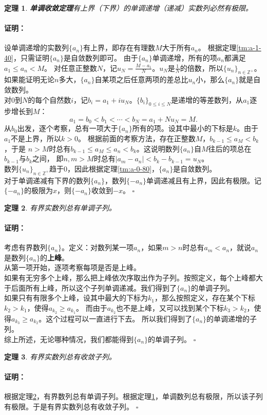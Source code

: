 \documentclass[12pt,UTF8]{ctexbook}
\newtheorem{tm}{定理}[section]
\newenvironment{proof2}{\paragraph{\textbf{证明：}}}{\hfill$\square$}
\begin{document}
\begin{appendix}
\begin{tm}\textbf{单调收敛定理}\label{tm:a-2-10}
    有上界（下界）的单调递增（递减）实数列必然有极限。
\end{tm}
\begin{proof2}
    设单调递增的实数列$\{a_n\}$有上界，即存在有理数$M$大于所有$a_n$。
    根据定理\ref{tm:a-1-40}，只需证明$\{a_n\}$是自敛数列即可。
    由于$\{a_n\}$单调递增，所有的项$a_n$都满足$a_1\leqslant a_n < M$。
    对任意正整数$N$，记$u_N = \frac{M - a_1}{N}$。$u_N$是$\frac{1}{N}$的倍数，所以$\{u_n\}_{n\in\mathbb{Z}^+}$。
    如果能证明无论$n$多大，$\{a_n\}$自某项之后任意两项的差总比$u_n$小，那么$\{a_n\}$就是自敛数列。\\
    对$0$到$N$的每个自然数$i$，记$b_i = a_1 + iu_N$。$\{b_i\}_{0\leqslant i\leqslant N}$是递增的等差数列，从$a_1$逐步增长到$M$：
    $$ a_1 = b_0 < b_1 < \cdots < b_N = a_1 + Nu_N = M.$$
    从$b_0$出发，逐个考察，总有一项大于$\{a_n\}$所有的项。设其中最小的下标是$k$。由于$a_1$不是上界，所以$k>0$。
    根据前面的考察方法，存在正整数$M$，$b_{k-1} \leqslant a_M < b_k$，于是
    $n>M$时总有$b_{k-1} \leqslant a_M \leqslant a_n < b_k$。这说明数列$\{a_n\}$自$M$往后的项总在$b_{k-1}$与$b_k$之间，
    即$n,m>M$时总有$|a_m - a_n| < b_k - b_{k-1} = u_N$。\\
    数列$\{u_n\}_{n\in\mathbb{Z}^+}$趋于$0$，因此根据定理\ref{tm:a-0-80}，$\{a_n\}$是自敛数列。\\
    对于单调递减有下界的数列$\{a_n\}$，数列$\{-a_n\}$单调递减且有上界，因此有极限。记$\{-a_n\}$的极限为$x$，则$\{-a_n\}$收敛到$-x$。
\end{proof2}

\begin{tm}\label{tm:a-2-20}
    有界实数列总有单调子列。
\end{tm}
\begin{proof2}
    考虑有界数列$\{a_n\}$。定义：对数列某一项$a_n$，如果$m>n$时总有$a_m < a_n$，就说$a_n$是数列$\{a_n\}$的\textbf{上峰}。\\
    从第一项开始，逐项考察每项是否是上峰。\\
    如果有无穷多个上峰，那么把上峰依次序取出作为子列。按照定义，每个上峰都大于后面所有上峰，所以这个子列单调递减。我们得到了$\{a_n\}$的单调子列。\\
    如果只有有限多个上峰，设其中最大的下标为$k_1$，那么按照定义，存在某个下标$k_2 > k_1$，使得$a_{k_2} \geqslant a_{k_1}$。
    而由于$a_{k_2}$也不是上峰，又可以找到某个下标$k_3 > k_2$，使得$a_{k_3} \geqslant a_{k_2}$。这个过程可以一直进行下去。
    所以我们得到了$\{a_n\}$的单调递增的子列。\\
    综上所述，无论哪种情况，我们都能得到$\{a_n\}$的单调子列。
\end{proof2}

\begin{tm}\label{tm:a-2-30}
    有界实数列总有收敛子列。
\end{tm}
\begin{proof2}
    根据定理\ref{tm:a-2-20}，有界数列总有单调子列。根据定理\ref{tm:a-2-10}，单调数列总有极限，所以该子列有极限。于是有界实数列总有收敛子列。
\end{proof2}

\end{appendix}
\end{document}
